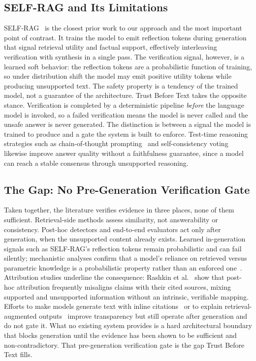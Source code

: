\documentclass[conference]{IEEEtran}
\begin{document}
\subsection{SELF-RAG and Its Limitations}
SELF-RAG~\cite{asai2023selfrag} is the closest prior work to our approach
and the most important point of contrast. It trains the model to emit
reflection tokens during generation that signal retrieval utility and
factual support, effectively interleaving verification with synthesis in a
single pass. The verification signal, however, is a learned soft behavior:
the reflection tokens are a probabilistic function of training, so under
distribution shift the model may emit positive utility tokens while
producing unsupported text. The safety property is a tendency of the
trained model, not a guarantee of the architecture. Trust Before Text
takes the opposite stance. Verification is completed by a deterministic
pipeline \textit{before} the language model is invoked, so a failed
verification means the model is never called and the unsafe answer is
never generated. The distinction is between a signal the model is trained
to produce and a gate the system is built to enforce. Test-time reasoning
strategies such as chain-of-thought prompting~\cite{wei2022cot} and
self-consistency voting~\cite{wang2023selfconsistency} likewise improve
answer quality without a faithfulness guarantee, since a model can reach a
stable consensus through unsupported reasoning.

\subsection{The Gap: No Pre-Generation Verification Gate}
Taken together, the literature verifies evidence in three places, none of
them sufficient. Retrieval-side methods assess similarity, not
answerability or consistency. Post-hoc detectors and end-to-end evaluators
act only after generation, when the unsupported content already exists.
Learned in-generation signals such as SELF-RAG's reflection tokens remain
probabilistic and can fail silently; mechanistic analyses confirm that a
model's reliance on retrieved versus parametric knowledge is a probabilistic
property rather than an enforced one~\cite{sun2024redeep}. Attribution
studies underline the consequence: Rashkin et
al.~\cite{rashkin2023attribution} show that post-hoc attribution frequently
misaligns claims with their cited sources, mixing supported and unsupported
information without an intrinsic, verifiable mapping. Efforts to make models
generate text with inline citations~\cite{gao2023alce} or to explain
retrieval-augmented outputs~\cite{rorseth2024explain} improve transparency
but still operate after generation and do not gate it. What no existing
system provides is a hard
architectural boundary that blocks generation until the evidence has been
shown to be sufficient and non-contradictory. That pre-generation
verification gate is the gap Trust Before Text fills.
\end{document}
